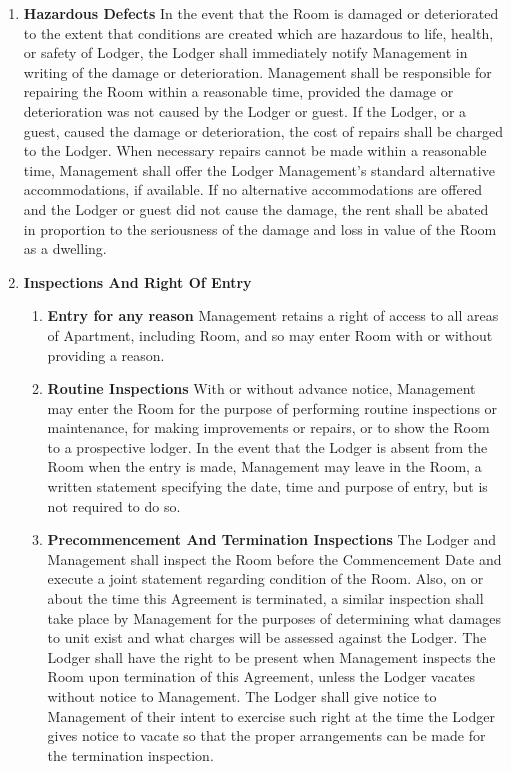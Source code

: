 \documentclass[12pt,letterpaper]{article}
\newcommand{\lodger}{Lodger}
\newcommand{\management}{Management}
\newcommand{\apt}{Apartment}
\newcommand{\room}{Room}
\newcommand{\signdate}{Commencement Date}
\begin{document}
\begin{enumerate}
	\item \textbf{Hazardous Defects }
		In the event that the \room{} is damaged or deteriorated to the extent that conditions are created which are hazardous to life, health, or safety of \lodger{}, the \lodger{} shall immediately notify \management{} in writing of the damage or deterioration. \management{} shall be responsible for repairing the \room{} within a reasonable time, provided the damage or deterioration was not caused by the \lodger{} or guest. If the \lodger{}, or a guest, caused the damage or deterioration, the cost of repairs shall be charged to the \lodger{}. When necessary repairs cannot be made within a reasonable time, \management{} shall offer the \lodger{} \management{}'s standard alternative accommodations, if available. If no alternative accommodations are offered and the \lodger{} or guest did not cause the damage, the rent shall be abated in proportion to the seriousness of the damage and loss in value of the \room{} as a dwelling. 
	\item \textbf{Inspections And Right Of Entry} \quad 
		\begin{enumerate}
			\item \textbf{Entry for any reason} \quad \management{} retains a right of access to all areas of \apt{}, including \room{}, and so may enter \room{} with or without providing a reason.
			\item \textbf{Routine Inspections} \quad With or without advance notice, \management{} may enter the \room{} for the purpose of performing routine inspections or maintenance, for making improvements or repairs, or to show the \room{} to a prospective lodger. In the event that the \lodger{} is absent from the \room{} when the entry is made, \management{} may leave in the \room{}, a written statement specifying the date, time and purpose of entry, but is not required to do so.
			\item \textbf{Precommencement And Termination Inspections} \quad The \lodger{} and \management{} shall inspect the \room{} before the \signdate{} and execute a joint statement regarding condition of the \room{}. Also, on or about the time this Agreement is terminated, a similar inspection shall take place by \management{} for the purposes of determining what damages to unit exist and what charges will be assessed against the \lodger{}. The \lodger{} shall have the right to be present when \management{} inspects the \room{} upon termination of this Agreement, unless the \lodger{} vacates without notice to \management{}. The \lodger{} shall give notice to \management{} of their intent to exercise such right at the time the \lodger{} gives notice to vacate so that the proper arrangements can be made for the termination inspection. 

\end{enumerate}
\end{enumerate}
\end{document}
